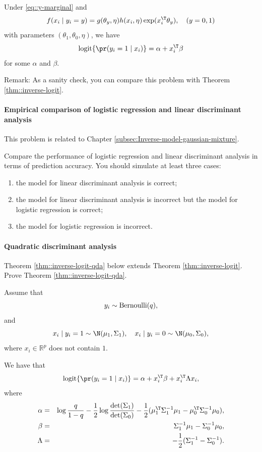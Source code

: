 \begin{theorem}
\label{thm::efron-logit}
Under \eqref{eq::y-marginal} and 
$$
f(x_i\mid y_i = y) = g(\theta_y, \eta) h(x_i,\eta) \exp(x_i^{\T} \theta_y) ,\quad (y=0,1)
$$
with parameters $(\theta_1,\theta_0,\eta)$, 
we have
$$
\textup{logit}\{  \pr(y_i =1\mid x_i) \} = \alpha + x_i^{\T} \beta
$$
for some $\alpha$ and $\beta$. 
\end{theorem}

Remark: As a sanity check, you can compare this problem with Theorem \ref{thm::inverse-logit}. 




\paragraph{Empirical comparison of logistic regression and linear discriminant analysis}

This problem is related to Chapter \ref{subsec:Inverse-model-gaussian-mixture}. 

Compare the performance of logistic regression and linear discriminant analysis in terms of prediction accuracy. You should simulate at least three cases: 
\begin{enumerate}[label=(C\arabic*), ref=C\arabic*]
\item
the model for linear discriminant analysis is correct;
\item
the model for linear discriminant analysis is incorrect but the model for logistic regression is correct;
\item
the model for logistic regression is incorrect. 
\end{enumerate}
 



\paragraph{Quadratic discriminant analysis}\label{hw17::QDA}



Theorem \ref{thm::inverse-logit-qda} below extends Theorem \ref{thm::inverse-logit}. Prove Theorem \ref{thm::inverse-logit-qda}. 


\begin{theorem}
\label{thm::inverse-logit-qda}
Assume that 
$$
y_{i}\sim\textup{Bernoulli}(q),
$$
and
$$
x_{i}\mid y_{i}=1\sim\N(\mu_{1},\Sigma_1),\quad x_{i}\mid y_{i}=0\sim\N(\mu_{0},\Sigma_0),
$$ 
where $x_i \in \mathbb{R}^p$ does not contain $1$.

We have that
$$
 \textup{logit}\{  \pr(y_i =1\mid x_i) \} = \alpha + x_i^{\T} \beta + x_i^{\T} \Lambda x_i , 
$$
where
\begin{eqnarray*}
\alpha &=&  \log \frac{q}{1-q} - \frac{1}{2} \log \frac{  \text{det} (\Sigma_1) }{  \text{det} (\Sigma_0) }
- \frac{1}{2} ( \mu_{1}^{\T}\Sigma_1^{-1}\mu_{1}-\mu_{0}^{\T}\Sigma_0^{-1}\mu_{0}  ),\\
\beta &=& \Sigma^{-1}_1 \mu_{1}- \Sigma^{-1}_0\mu_{0} , \\
\Lambda &=& - \frac{1}{2} ( \Sigma^{-1}_1 - \Sigma^{-1}_0 ).
\end{eqnarray*} 
\end{theorem}


